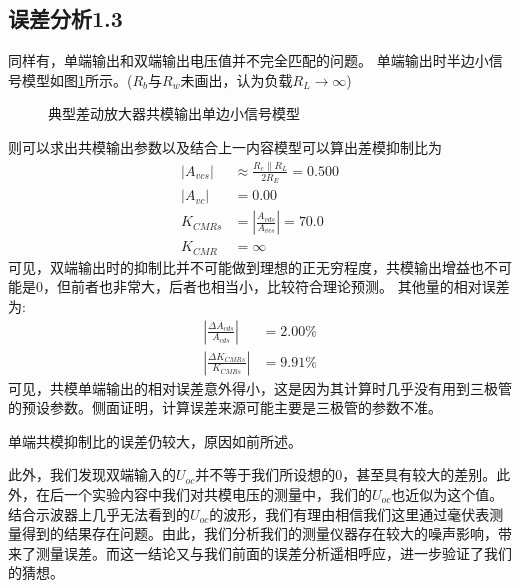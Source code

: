 \documentclass[a4paper,11pt,UTF8]{ctexart}
\begin{document}
	\subsection{误差分析1.3}
	同样有，单端输出和双端输出电压值并不完全匹配的问题。
	单端输出时半边小信号模型如图\ref{fig:ncSmallSignal}所示。($R_b$与$R_w$未画出，认为负载$R_L\rightarrow\infty$)
	\begin{figure}[htbp]
		\centering
		\caption{典型差动放大器共模输出单边小信号模型}
		\label{fig:ncSmallSignal}
	\end{figure}
	则可以求出共模输出参数以及结合上一内容模型可以算出差模抑制比为
	\begin{equation}
		\begin{aligned}
			\left | A_{vcs}\right |&\approx\frac{R_c\parallel R_L}{2R_E}=0.500\\
			\left | A_{vc}\right |&=0.00\\
			K_{CMRs}&=\left |\frac{A_{vds}}{A_{vcs}}\right |=70.0\\
			K_{CMR}&=\infty
		\end{aligned}
	\end{equation}
	可见，双端输出时的抑制比并不可能做到理想的正无穷程度，共模输出增益也不可能是0，但前者也非常大，后者也相当小，比较符合理论预测。
	其他量的相对误差为:
	\begin{equation}
		\begin{aligned}
			\left |\frac{\Delta A_{cds}}{A_{cds}}\right |&=2.00\%\\
			\left |\frac{\Delta K_{CMRs}}{K_{CMRs}}\right |&=9.91\%
		\end{aligned}
	\end{equation}
	可见，共模单端输出的相对误差意外得小，这是因为其计算时几乎没有用到三极管的预设参数。侧面证明，计算误差来源可能主要是三极管的参数不准。
	
	单端共模抑制比的误差仍较大，原因如前所述。
	
	此外，我们发现双端输入的$U_{oc}$并不等于我们所设想的0，甚至具有较大的差别。此外，在后一个实验内容中我们对共模电压的测量中，我们的$U_{oc}$也近似为这个值。结合示波器上几乎无法看到的$U_{oc}$的波形，我们有理由相信我们这里通过毫伏表测量得到的结果存在问题。由此，我们分析我们的测量仪器存在较大的噪声影响，带来了测量误差。而这一结论又与我们前面的误差分析遥相呼应，进一步验证了我们的猜想。
	
\end{document}
